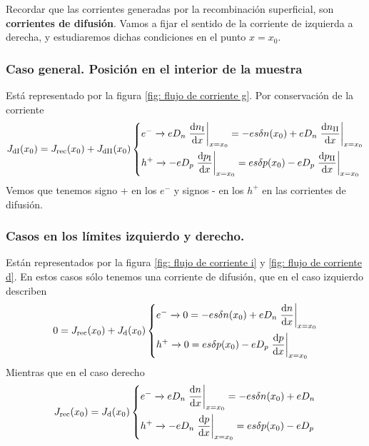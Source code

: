 Recordar que las corrientes generadas por la recombinación superficial, son \textbf{corrientes de difusión}. Vamos a fijar el sentido de la corriente de izquierda a derecha, y estudiaremos dichas condiciones en el punto $x=x_0$.
\subsubsection{Caso general. Posición en el interior de la muestra}
\noindent Está representado por la figura \ref{fig: flujo de corriente g}. Por conservación de la corriente 
\begin{equation}
J_\mathrm{dI}(x_0)=J_\mathrm{rec}(x_0)+J_\mathrm{dII}(x_0) \left \{
\begin{aligned}
    &e^- \xrightarrow{} eD_n \left. \diff[]{n_\mathrm{I}}{x}\right|_{x=x_0}=-es\delta n (x_0)+eD_n\left. \diff[]{n_\mathrm{II}}{x}\right|_{x=x_0} \\
    &h^+ \xrightarrow{} -eD_p \left. \diff[]{p_\mathrm{I}}{x}\right|_{x=x_0}=es\delta p (x_0)-eD_p\left. \diff[]{p_\mathrm{II}}{x}\right|_{x=x_0}
\end{aligned}
\right.
\end{equation}
Vemos que tenemos signo + en los $e^-$ y signos - en los $h^+$ en las corrientes de difusión.
\subsubsection{Casos en los límites izquierdo y derecho.}
Están representados por la figura \ref{fig: flujo de corriente i} y \ref{fig: flujo de corriente d}. En estos casos sólo tenemos una corriente de difusión, que en el caso izquierdo describen
\begin{equation}
   0=J_\mathrm{rec}(x_0)+J_\mathrm{d}(x_0) \left \{
\begin{aligned}
    &e^- \xrightarrow{} 0=-es\delta n (x_0)+eD_n\left. \diff[]{n}{x}\right|_{x=x_0} \\
    &h^+ \xrightarrow{} 0=es\delta p (x_0)-eD_p\left. \diff[]{p}{x}\right|_{x=x_0}
\end{aligned} \right.
\end{equation}
Mientras que en el caso derecho
\begin{equation}
   J_\mathrm{rec}(x_0)=J_\mathrm{d}(x_0) \left \{
\begin{aligned}
    &e^- \xrightarrow{} eD_n\left. \diff[]{n}{x}\right|_{x=x_0}=-es\delta n (x_0)+eD_n \\
    &h^+ \xrightarrow{} -eD_n\left. \diff[]{p}{x}\right|_{x=x_0}=es\delta p (x_0)-eD_p
\end{aligned} \right.
\end{equation}



